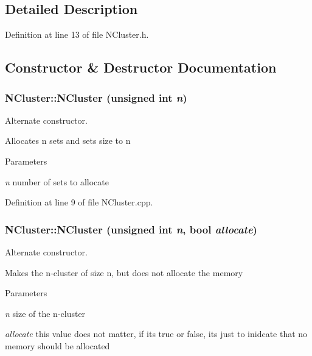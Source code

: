 \subsection{Detailed Description}


Definition at line 13 of file NCluster.h.



\subsection{Constructor \& Destructor Documentation}
\hypertarget{class_n_cluster_ac6460cead5fb2cf1a46354ab26f36e0a}{
\subsubsection[{NCluster}]{\setlength{\rightskip}{0pt plus 5cm}NCluster::NCluster (unsigned int {\em n})}}
\label{class_n_cluster_ac6460cead5fb2cf1a46354ab26f36e0a}


Alternate constructor. 

Allocates n sets and sets size to n 
\begin{DoxyParams}{Parameters}
\item[{\em n}]number of sets to allocate \end{DoxyParams}


Definition at line 9 of file NCluster.cpp.

\hypertarget{class_n_cluster_ad64a3005375dd6aad2848f227ce92ef6}{
\subsubsection[{NCluster}]{\setlength{\rightskip}{0pt plus 5cm}NCluster::NCluster (unsigned int {\em n}, \/  bool {\em allocate})}}
\label{class_n_cluster_ad64a3005375dd6aad2848f227ce92ef6}


Alternate constructor. 

Makes the n-\/cluster of size n, but does not allocate the memory 
\begin{DoxyParams}{Parameters}
\item[{\em n}]size of the n-\/cluster \item[{\em allocate}]this value does not matter, if its true or false, its just to inidcate that no memory should be allocated \end{DoxyParams}


